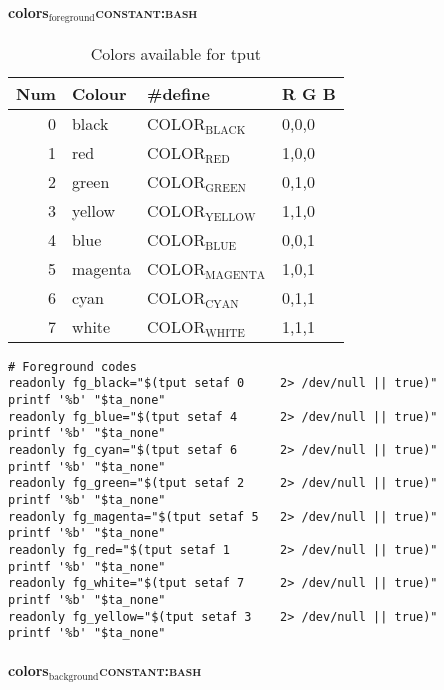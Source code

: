 \documentclass[11pt]{article}
\begin{document}
\paragraph{colors\(_{\text{foreground}}\)\hfill{}\textsc{constant:bash}}
\label{sec:org82b54e9}

\begin{table}[htbp]
\caption{Colors available for tput}
\centering
\begin{tabular}{rlll}
\hline
Num & Colour & \#define & R G B\\
\hline
0 & black & COLOR\(_{\text{BLACK}}\) & 0,0,0\\
1 & red & COLOR\(_{\text{RED}}\) & 1,0,0\\
2 & green & COLOR\(_{\text{GREEN}}\) & 0,1,0\\
3 & yellow & COLOR\(_{\text{YELLOW}}\) & 1,1,0\\
4 & blue & COLOR\(_{\text{BLUE}}\) & 0,0,1\\
5 & magenta & COLOR\(_{\text{MAGENTA}}\) & 1,0,1\\
6 & cyan & COLOR\(_{\text{CYAN}}\) & 0,1,1\\
7 & white & COLOR\(_{\text{WHITE}}\) & 1,1,1\\
\hline
\end{tabular}
\end{table}

\begin{verbatim}
# Foreground codes
readonly fg_black="$(tput setaf 0     2> /dev/null || true)"
printf '%b' "$ta_none"
readonly fg_blue="$(tput setaf 4      2> /dev/null || true)"
printf '%b' "$ta_none"
readonly fg_cyan="$(tput setaf 6      2> /dev/null || true)"
printf '%b' "$ta_none"
readonly fg_green="$(tput setaf 2     2> /dev/null || true)"
printf '%b' "$ta_none"
readonly fg_magenta="$(tput setaf 5   2> /dev/null || true)"
printf '%b' "$ta_none"
readonly fg_red="$(tput setaf 1       2> /dev/null || true)"
printf '%b' "$ta_none"
readonly fg_white="$(tput setaf 7     2> /dev/null || true)"
printf '%b' "$ta_none"
readonly fg_yellow="$(tput setaf 3    2> /dev/null || true)"
printf '%b' "$ta_none"
\end{verbatim}

\paragraph{colors\(_{\text{background}}\)\hfill{}\textsc{constant:bash}}
\label{sec:org914d50d}
\end{document}
